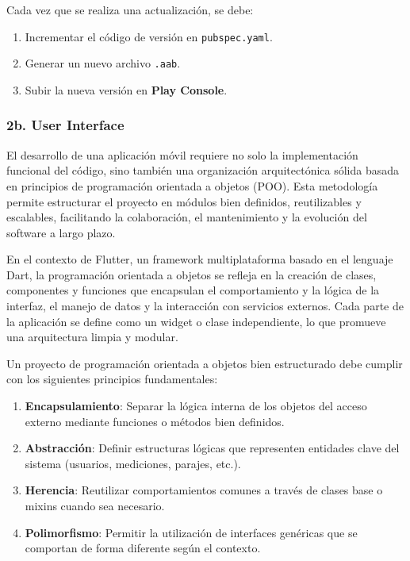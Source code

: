 Cada vez que se realiza una actualización, se debe:

\begin{enumerate}
    \item Incrementar el código de versión en \texttt{pubspec.yaml}.
    \item Generar un nuevo archivo \texttt{.aab}.
    \item Subir la nueva versión en \textbf{Play Console}.
\end{enumerate}





\subsubsection{2b. User Interface}

El desarrollo de una aplicación móvil requiere no solo la implementación funcional del código, sino también una organización arquitectónica sólida basada en principios de programación orientada a objetos (POO). Esta metodología permite estructurar el proyecto en módulos bien definidos, reutilizables y escalables, facilitando la colaboración, el mantenimiento y la evolución del software a largo plazo.

En el contexto de Flutter, un framework multiplataforma basado en el lenguaje Dart, la programación orientada a objetos se refleja en la creación de clases, componentes y funciones que encapsulan el comportamiento y la lógica de la interfaz, el manejo de datos y la interacción con servicios externos. Cada parte de la aplicación se define como un widget o clase independiente, lo que promueve una arquitectura limpia y modular.

Un proyecto de programación orientada a objetos bien estructurado debe cumplir con los siguientes principios fundamentales:

\begin{enumerate}
    \item \textbf{Encapsulamiento}: Separar la lógica interna de los objetos del acceso externo mediante funciones o métodos bien definidos.
    \item \textbf{Abstracción}: Definir estructuras lógicas que representen entidades clave del sistema (usuarios, mediciones, parajes, etc.).
    \item \textbf{Herencia}: Reutilizar comportamientos comunes a través de clases base o mixins cuando sea necesario.
    \item \textbf{Polimorfismo}: Permitir la utilización de interfaces genéricas que se comportan de forma diferente según el contexto.
\end{enumerate}



